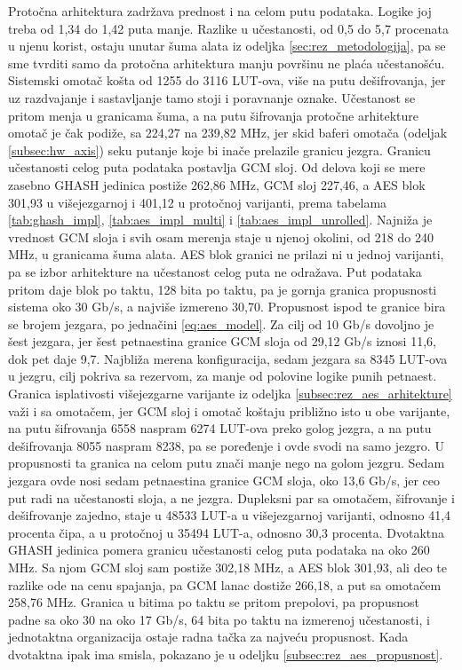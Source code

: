Protočna arhitektura zadržava prednost i na celom putu podataka. Logike joj treba od 1,34 do 1,42 puta manje. Razlike u učestanosti, od 0,5 do 5,7 procenata u njenu korist, ostaju unutar šuma alata iz odeljka \ref{sec:rez_metodologija}, pa se sme tvrditi samo da protočna arhitektura manju površinu ne plaća učestanošću.
\smallbreak
Sistemski omotač košta od 1255 do 3116 LUT-ova, više na putu dešifrovanja, jer uz razdvajanje i sastavljanje tamo stoji i poravnanje oznake. Učestanost se pritom menja u granicama šuma, a na putu šifrovanja protočne arhitekture omotač je čak podiže, sa 224,27 na 239,82 MHz, jer skid baferi omotača (odeljak \ref{subsec:hw_axis}) seku putanje koje bi inače prelazile granicu jezgra.
\smallbreak
Granicu učestanosti celog puta podataka postavlja GCM sloj. Od delova koji se mere zasebno GHASH jedinica postiže 262,86 MHz, GCM sloj 227,46, a AES blok 301,93 u višejezgarnoj i 401,12 u protočnoj varijanti, prema tabelama \ref{tab:ghash_impl}, \ref{tab:aes_impl_multi} i \ref{tab:aes_impl_unrolled}. Najniža je vrednost GCM sloja i svih osam merenja staje u njenoj okolini, od 218 do 240 MHz, u granicama šuma alata. AES blok granici ne prilazi ni u jednoj varijanti, pa se izbor arhitekture na učestanost celog puta ne odražava. Put podataka pritom daje blok po taktu, 128 bita po taktu, pa je gornja granica propusnosti sistema oko 30 Gb/s, a najviše izmereno 30,70.
\smallbreak
Propusnost ispod te granice bira se brojem jezgara, po jednačini \eqref{eq:aes_model}. Za cilj od 10 Gb/s dovoljno je šest jezgara, jer šest petnaestina granice GCM sloja od 29,12 Gb/s iznosi 11,6, dok pet daje 9,7. Najbliža merena konfiguracija, sedam jezgara sa 8345 LUT-ova u jezgru, cilj pokriva sa rezervom, za manje od polovine logike punih petnaest. Granica isplativosti višejezgarne varijante iz odeljka \ref{subsec:rez_aes_arhitekture} važi i sa omotačem, jer GCM sloj i omotač koštaju približno isto u obe varijante, na putu šifrovanja 6558 naspram 6274 LUT-ova preko golog jezgra, a na putu dešifrovanja 8055 naspram 8238, pa se poređenje i ovde svodi na samo jezgro. U propusnosti ta granica na celom putu znači manje nego na golom jezgru. Sedam jezgara ovde nosi sedam petnaestina granice GCM sloja, oko 13,6 Gb/s, jer ceo put radi na učestanosti sloja, a ne jezgra. Dupleksni par sa omotačem, šifrovanje i dešifrovanje zajedno, staje u 48533 LUT-a u višejezgarnoj varijanti, odnosno 41,4 procenta čipa, a u protočnoj u 35494 LUT-a, odnosno 30,3 procenta.
\smallbreak
Dvotaktna GHASH jedinica pomera granicu učestanosti celog puta podataka na oko 260 MHz. Sa njom GCM sloj sam postiže 302,18 MHz, a AES blok 301,93, ali deo te razlike ode na cenu spajanja, pa GCM lanac dostiže 266,18, a put sa omotačem 258,76 MHz. Granica u bitima po taktu se pritom prepolovi, pa propusnost padne sa oko 30 na oko 17 Gb/s, 64 bita po taktu na izmerenoj učestanosti, i jednotaktna organizacija ostaje radna tačka za najveću propusnost. Kada dvotaktna ipak ima smisla, pokazano je u odeljku \ref{subsec:rez_aes_propusnost}.
